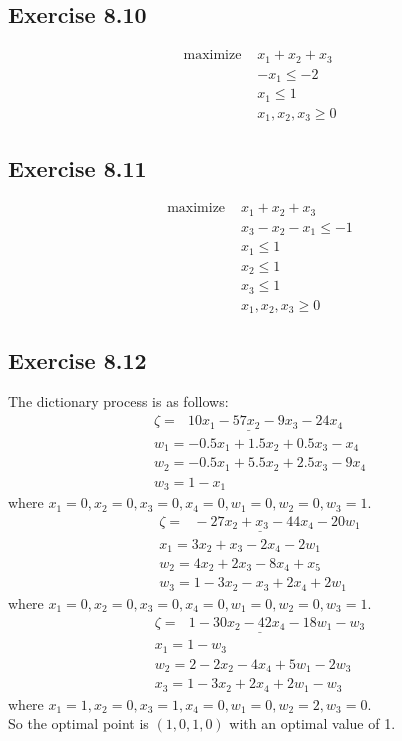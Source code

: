 \documentclass[11.5pt, letterpaper, bibtotoc,
    tablecaptionabove, figurecaptionabove]{article}
\begin{document}
\subsection*{Exercise 8.10}
\begin{align*}
	\text{maximize  } &x_1 + x_2 + x_3 \\
	& -x_1 \leq -2\\
	& x_1 \leq 1\\
	& x_1, x_2, x_3 \geq 0
\end{align*}

\subsection*{Exercise 8.11}
\begin{align*}
	\text{maximize  } &x_1 + x_2 + x_3 \\
	& x_3 - x_2 - x_1 \leq -1\\
	& x_1 \leq 1\\
	& x_2 \leq 1\\
	& x_3 \leq 1\\
	& x_1, x_2, x_3 \geq 0
\end{align*}

 \subsection*{Exercise 8.12}
 The dictionary process is as follows:
\begin{align*}
	\underline{\zeta = \:\:\: 10x_1 - 57x_2 - 9x_3 - 24x_4}\\
	w_1 = -0.5x_1 + 1.5x_2 + 0.5x_3 - x_4\\
	w_2 = -0.5x_1 + 5.5x_2 + 2.5x_3 - 9x_4 \\
	w_3 = 1 - x_1
\end{align*}
where $x_1 = 0, x_2 = 0, x_3 = 0, x_4 = 0, w_1 = 0, w_2 = 0, w_3 = 1$.
\begin{align*}
	\underline{\zeta = \:\:\: -27x_2 + x_3 - 44x_4 - 20w_1}\\
	x_1 = 3x_2 + x_3 - 2x_4 - 2w_1\\
	w_2 = 4x_2 + 2x_3 - 8x_4 + x_5\\
	w_3 = 1 - 3x_2 - x_3 + 2x_4 + 2w_1
\end{align*}
 where $x_1 = 0, x_2 = 0, x_3 = 0, x_4 = 0, w_1 = 0, w_2 = 0, w_3 = 1$.
\begin{align*}
	\underline{\zeta = \:\:\: 1 - 30x_2 - 42x_4 - 18w_1 - w_3}\\
	x_1 = 1 - w_3\\
	w_2 = 2 - 2x_2 - 4x_4 + 5w_1 - 2w_3\\
	x_3 = 1 - 3x_2  + 2x_4 + 2w_1 - w_3
\end{align*}
 where $x_1 = 1, x_2 = 0, x_3 = 1, x_4 = 0, w_1 = 0, w_2 = 2, w_3 = 0$.\\
 So the optimal point is $(1, 0, 1, 0)$ with an optimal value of 1.
\end{document}
